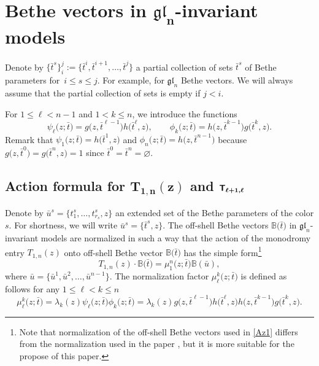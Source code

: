 \documentclass[10pt,a4paper]{amsart}
\newcommand{\bu}{\bar u}
\newcommand{\bt}{{\bar t}}
\theoremstyle{definition}
\def\BB{{\mathbb{B}}}
\def\r#1{\eqref{#1}}
\def\sT{{\sf T}}
\begin{document}
\section[Bethe vectors in gl\_n-invariant models]{Bethe vectors in $\boldsymbol{\mathfrak{gl}_n}$-invariant models}\label{sect:gln}

Denote by $\bigl\{\bt^s\bigr\}_i^{j}:=\bigl\{\bt^i,\bt^{i+1},\dots,\bt^{j}\bigr\}$
 a partial collection of sets $\bt^s$ of Bethe parameters
 for~$i\leq s\leq j$.
 For example, \smash{$\bt=\bigl\{\bt^s\bigr\}_1^{n-1}$} for $\mathfrak{gl}_n$ Bethe vectors.
We will always assume that the partial collection of sets
\smash{$\bigl\{\bt^s\bigr\}_i^{j}$} is empty if $j<i$.

For $1\leq \ell<n-1$ and $1<k\leq n$, we introduce the functions
\[%
\psi_\ell\bigl(z;\bt\bigr)=g\bigl(z,\bt^{\ell-1}\bigr) h\bigl(\bt^\ell,z\bigr),\qquad \phi_k\bigl(z;\bt\bigr)=
h\bigl(z,\bt^{k-1}\bigr) g\bigl(\bt^k,z\bigr) .
\]
Remark that $\psi_1\bigl(z;\bt\bigr)=h\bigl(\bt^1,z\bigr)$ and $\phi_n\bigl(z;\bt\bigr)=h\bigl(z,\bt^{n-1}\bigr)$
because $g\bigl(z,\bt^0\bigr)=g\bigl(\bt^n,z\bigr)= 1$ since $\bt^0=\bt^n = \varnothing$.

\subsection[Action formula for T\_1,n(z) and T\_l+1,l]{Action formula for $\boldsymbol{T_{1,n}(z)}$ and $\boldsymbol{\sT_{\ell+1,\ell}}$}

Denote by $\bu^s=\bigl\{t^s_1,\dots,t^s_{r_s},z\bigr\}$ an extended set of the Bethe parameters of the color $s$. For shortness, we will write $\bu^s=\bigl\{\bt^s,z\bigr\}$.
The off-shell Bethe vectors
$\BB\bigl(\bt\bigr)$ in $\mathfrak{gl}_n$-invariant models are normalized in such a way that
the action of the monodromy entry $T_{1,n}(z)$ onto off-shell Bethe vector
$\BB\bigl(\bt\bigr)$ has the simple form\footnote{Note that normalization of the
off-shell Bethe vectors used in \r{Az1} differs from the normalization used
in the paper \cite{HLPRS17b}, but it is more suitable for the propose of this paper.}
\begin{equation}\label{Az1}
T_{1,n}(z)\cdot \BB\bigl(\bt\bigr)=\mu_1^n\bigl(z;\bt\bigr) \BB(\bu) ,
\end{equation}
where $\bu=\bigl\{\bu^1,\bu^2,\dots,\bu^{n-1}\bigr\}$.
The normalization factor $\mu_\ell^k\bigl(z;\bt\bigr)$ is defined as follows
for any $1\leq \ell<k\leq n$
\begin{equation}\label{Az2}
\mu_\ell^k\bigl(z;\bt\bigr)=\lambda_k(z) \psi_\ell\bigl(z;\bt\bigr) \phi_k\bigl(z;\bt\bigr)=\lambda_k(z)
g\bigl(z,\bt^{\ell-1}\bigr) h\bigl(\bt^\ell,z\bigr) h\bigl(z,\bt^{k-1}\bigr) g\bigl(\bt^k,z\bigr) .
\end{equation}
\end{document}
